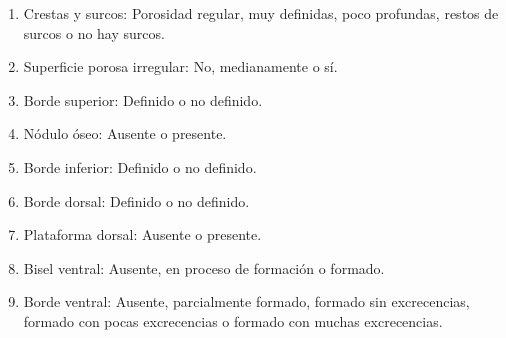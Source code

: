 \begin{enumerate}
	\item Crestas y surcos: Porosidad regular, muy definidas, poco profundas, restos de surcos o no hay surcos.
	\item Superficie porosa irregular: No, medianamente o sí.
	\item Borde superior: Definido o no definido.
	\item Nódulo óseo: Ausente o presente.
	\item Borde inferior: Definido o no definido.
	\item Borde dorsal: Definido o no definido.
	\item Plataforma dorsal: Ausente o presente.
	\item Bisel ventral: Ausente, en proceso de formación o formado.
	\item Borde ventral: Ausente, parcialmente formado, formado sin excrecencias, formado con pocas excrecencias o formado con muchas excrecencias.
\end{enumerate}

\begin{table}[H]
	\caption{Algunos ejemplos de las características consideradas por Todd.}\label{table:caracteristicas_todd}
\end{table}

